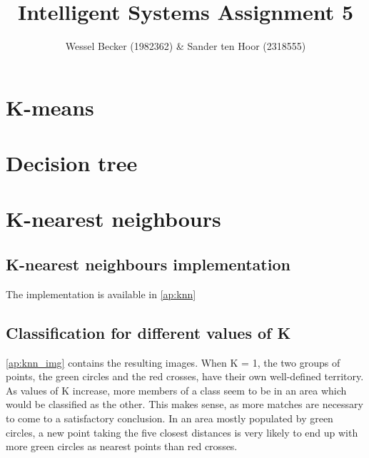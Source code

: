 \documentclass[10pt,a4paper]{article}
\begin{document}
\title{Intelligent Systems Assignment 5}
\author{Wessel Becker (1982362) \& Sander ten Hoor (2318555)}
\maketitle

\newcommand{\simplesubfigure}[3]{
  \noindent\begin{minipage}{.31\linewidth}
    \begin{center}
      \texttt{[image: \#1]}
      \captionof{figure}{#2}
      \label{#3}
    \end{center}
  \end{minipage}\hspace{7pt}
}
\newcommand{\simplefigure}[3]{
	\begin{figure}[H]
  	\centering
    	\makebox[\textwidth]
    	{
    		\texttt{[image: \#1]}
 		} \\
  		\caption{#2}
  		\label{#3}
	\end{figure}
}
\newcommand{\mcode}[1]{
	
}

\section{K-means}
\section{Decision tree}
\section{K-nearest neighbours}
\subsection{K-nearest neighbours implementation}
The implementation is available in \ref{ap:knn}

\subsection{Classification for different values of K} \label{ss:class}
\ref{ap:knn_img} contains the resulting images. When K = 1, the two groups of points, the green circles and the red crosses, have their own well-defined territory. As values of K increase, more members of a class seem to be in an area which would be classified as the other. This makes sense, as more matches are necessary to come to a satisfactory conclusion. In an area mostly populated by green circles, a new point taking the five closest distances is very likely to end up with more green circles as nearest points than red crosses.
\end{document}
